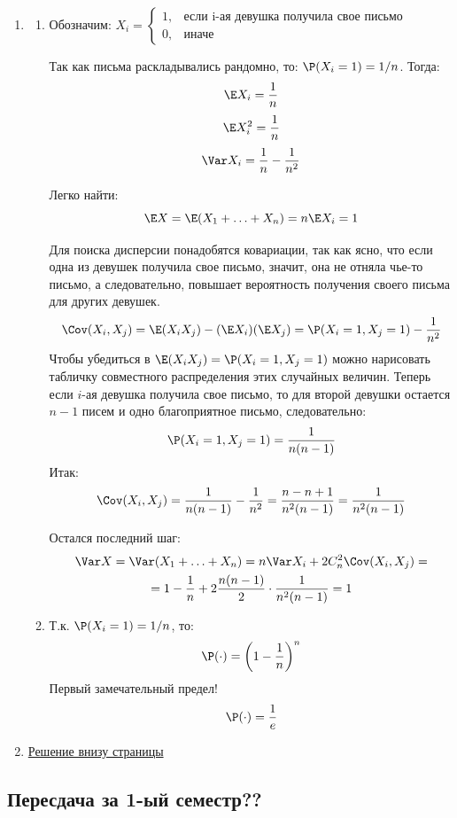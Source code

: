 \begin{enumerate}
\item
\begin{enumerate}
\item Обозначим:
$X_i =
\begin{cases}
1, &\text{если i-ая девушка получила свое письмо} \\
0, &\text{иначе}
\end{cases}
$

Так как письма раскладывались рандомно, то: $\P (X_i = 1) = 1/n$. Тогда:
\[ \E X_i = \frac{1}{n} \]
\[ \E X_i^2 = \frac{1}{n} \]
\[ \Var X_i = \frac{1}{n} - \frac{1}{n^2} \]

Легко найти:
\[ \E X = \E (X_1 + \ldots + X_n) = n \E X_i = 1 \]

Для поиска дисперсии понадобятся ковариации, так как ясно, что если одна из девушек получила свое письмо, значит, она не отняла чье-то письмо, а следовательно, повышает вероятность получения своего письма для других девушек.
\[\Cov(X_i, X_j) = \E (X_i X_j) - (\E X_i)( \E X_j ) = \P (X_i = 1, X_j = 1) - \frac{1}{n^2}   \]
Чтобы убедиться в \(  \E (X_i X_j) = \P (X_i = 1, X_j = 1) \) можно нарисовать табличку совместного распределения этих случайных величин.
Теперь если $i$-ая девушка получила свое письмо, то для второй девушки остается $n-1$ писем и одно благоприятное письмо, следовательно:
\[\P (X_i = 1, X_j = 1) = \frac{1}{n(n-1)} \]
Итак:
\[\Cov(X_i, X_j) = \frac{1}{n(n-1)} - \frac{1}{n^2} =  \frac{n - n + 1}{n^2 (n-1)}  = \frac{ 1}{n^2 (n-1)} \]

Остался последний шаг:
\begin{multline*}
\Var X = \Var (X_1 + \ldots + X_n) = n \Var X_i + 2C_n^2 \Cov(X_i, X_j) = \\
=   1 - \frac{1}{n} + 2 \frac{n (n-1)}{2} \cdot \frac{ 1}{n^2 (n-1)} = 1
\end{multline*}
\item Т.к. $\P (X_i = 1) = 1/n$, то: \[ \P(\cdot) = \left(1 - \frac{1}{n} \right)^n   \]
Первый замечательный предел!
\[ \P(\cdot) = \frac{1}{e} \]
\end{enumerate}

\item
\href{http://www.nsu.ru/mmf/tvims/chernova/tv/lec/node6.html}{Решение внизу страницы}

\end{enumerate}

\subsection{Пересдача за 1-ый семестр??}


